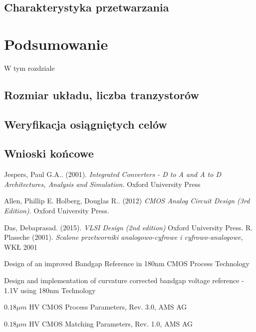 \documentclass[10pt,a4paper,twoside]{report}
\theoremstyle{definition}
\theoremstyle{definition}
\theoremstyle{definition}
\theoremstyle{definition}
\theoremstyle{definition}
\begin{document}
{{{{{	\section{Charakterystyka przetwarzania}

	\chapter{Podsumowanie}
	{	W tym rozdziale}
	\section{Rozmiar układu, liczba tranzystorów}
	\section{Weryfikacja osiągniętych celów}
	\section{Wnioski końcowe}


\begin{thebibliography}{9}
	Jespers, Paul G.A.. (2001). 
	\textit{Integrated Converters - D to A and A to D Architectures, Analysis and Simulation.}
	Oxford University Press
	
	Allen, Phillip E. Holberg, Douglas R.. (2012)  
	\textit{CMOS Analog Circuit Design (3rd Edition). }
	Oxford University Press.
	
	Das, Debaprasad. (2015).
	\textit{VLSI Design (2nd edition)}
	Oxford University Press.
	R. Plassche (2001). 
	\textit{Scalone przetworniki analogowo-cyfrowe i cyfrowo-analogowe,}
	WKŁ 2001
	
	Design of an improved Bandgap Reference in
	180nm CMOS Process Technology
	
	Design and implementation of curvature corrected
	bandgap voltage reference - 1.1V using 180nm Technology
	
	$0.18\mu m$ HV CMOS Process Parameters, Rev. 3.0, AMS AG
	
	$0.18\mu m$ HV CMOS Matching Parameters, Rev. 1.0, AMS AG
	
\end{thebibliography}
	\listoffigures

	\listoftables

}}}}}
\end{document}
